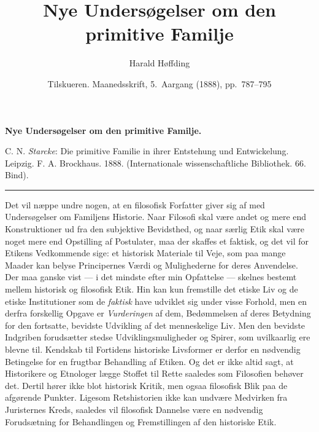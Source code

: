 \documentclass[12pt,a4paper,openany]{book}
\title{\textbf{Nye Undersøgelser om den primitive Familje}}
\author{Harald Høffding}
\date{Tilskueren. Maanedsskrift, 5.\ Aargang (1888), pp.~787--795}
\newcommand{\opage}[1]{\marginnote{\footnotesize\textit{[#1]}}}
\begin{document}
\maketitle
\thispagestyle{empty}
\clearpage

\opage{787}\begin{center}\textbf{\large Nye Undersøgelser om den primitive Familje.}\end{center}

\begin{center}\small C. N. \emph{Starcke}: Die primitive Familie in ihrer Entstehung und Entwickelung. Leipzig. F. A. Brockhaus. 1888. (Internationale wissenschaftliche Bibliothek. 66. Bind).\end{center}

\begin{center}\rule{1.3cm}{0.4pt}\end{center}

Det vil næppe undre nogen, at en filosofisk Forfatter giver
sig af med Undersøgelser om Familjens Historie. Naar Filosofi
skal være andet og mere end Konstruktioner ud fra den subjektive
Bevidsthed, og naar særlig Etik skal være noget mere end
Opstilling af Postulater, maa der skaffes et faktisk, og det vil for
Etikens Vedkommende sige: et historisk Materiale til Veje, som
paa mange Maader kan belyse Principernes Værdi og Mulighederne
for deres Anvendelse. Der maa ganske vist — i det mindste
efter min Opfattelse — skelnes bestemt mellem historisk og filosofisk
Etik. Hin kan kun fremstille det etiske Liv og de etiske
Institutioner som de \emph{faktisk} have udviklet sig under visse Forhold,
men en derfra forskellig Opgave er \emph{Vurderingen} af dem,
Bedømmelsen af deres Betydning for den fortsatte, bevidste Udvikling
af det menneskelige Liv. Men den bevidste Indgriben
forudsætter stedse Udviklingsmuligheder og Spirer, som uvilkaarlig
ere blevne til. Kendskab til Fortidens historiske Livsformer er
derfor en nødvendig Betingelse for en frugtbar Behandling af
Etiken. Og det er ikke altid sagt, at Historikere og Etnologer
lægge Stoffet til Rette saaledes som Filosofien behøver det. Dertil
hører ikke blot historisk Kritik, men ogsaa filosofisk Blik paa de
afgørende Punkter. Ligesom Retshistorien ikke kan undvære
Medvirken fra Juristernes Kreds, saaledes vil filosofisk Dannelse
være en nødvendig Forudsætning for Behandlingen og Fremstillingen
af den historiske Etik.
\end{document}
